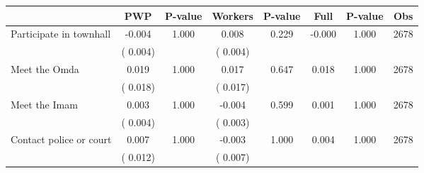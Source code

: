 
\begin{tabular}{l*{7}{c}}\hline&\multicolumn{1}{c}{PWP}&\multicolumn{1}{c}{P-value}&\multicolumn{1}{c}{Workers}&\multicolumn{1}{c}{P-value}&\multicolumn{1}{c}{Full}&\multicolumn{1}{c}{P-value}&\multicolumn{1}{c}{Obs} \\ \hline

 Participate in townhall       &             -0.004       &        1.000  &              0.008       &        0.229  &             -0.000       &              1.000 &  2678 \\ 
                       &       (       0.004)             &                               &       (       0.004)                     &                               &                                               &                                &                      \\ 

 Meet the Omda       &              0.019       &        1.000  &              0.017       &        0.647  &              0.018       &              1.000 &  2678 \\ 
                       &       (       0.018)             &                               &       (       0.017)                     &                               &                                               &                                &                      \\ 

 Meet the Imam       &              0.003       &        1.000  &             -0.004       &        0.599  &              0.001       &              1.000 &  2678 \\ 
                       &       (       0.004)             &                               &       (       0.003)                     &                               &                                               &                                &                      \\ 

 Contact police or court       &              0.007       &        1.000  &             -0.003       &        1.000  &              0.004       &              1.000 &  2678 \\ 
                       &       (       0.012)             &                               &       (       0.007)                     &                               &                                               &                                &                      \\ 


\end{tabular}

